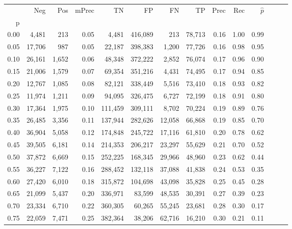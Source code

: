 \begin{tabular}{rrrrrrrrrrrrrr}
\toprule
{} &     Neg &    Pos & mPrec &       TN &       FP &      FN &      TP &  Prec &   Rec & $\hat{p}$ \\
p    &         &        &       &          &          &         &         &       &       &           \\
\midrule
0.00 &   4,481 &    213 &  0.05 &    4,481 &  416,089 &     213 &  78,713 &  0.16 &  1.00 &      0.99 \\
0.05 &  17,706 &    987 &  0.05 &   22,187 &  398,383 &   1,200 &  77,726 &  0.16 &  0.98 &      0.95 \\
0.10 &  26,161 &  1,652 &  0.06 &   48,348 &  372,222 &   2,852 &  76,074 &  0.17 &  0.96 &      0.90 \\
0.15 &  21,006 &  1,579 &  0.07 &   69,354 &  351,216 &   4,431 &  74,495 &  0.17 &  0.94 &      0.85 \\
0.20 &  12,767 &  1,085 &  0.08 &   82,121 &  338,449 &   5,516 &  73,410 &  0.18 &  0.93 &      0.82 \\
0.25 &  11,974 &  1,211 &  0.09 &   94,095 &  326,475 &   6,727 &  72,199 &  0.18 &  0.91 &      0.80 \\
0.30 &  17,364 &  1,975 &  0.10 &  111,459 &  309,111 &   8,702 &  70,224 &  0.19 &  0.89 &      0.76 \\
0.35 &  26,485 &  3,356 &  0.11 &  137,944 &  282,626 &  12,058 &  66,868 &  0.19 &  0.85 &      0.70 \\
0.40 &  36,904 &  5,058 &  0.12 &  174,848 &  245,722 &  17,116 &  61,810 &  0.20 &  0.78 &      0.62 \\
0.45 &  39,505 &  6,181 &  0.14 &  214,353 &  206,217 &  23,297 &  55,629 &  0.21 &  0.70 &      0.52 \\
0.50 &  37,872 &  6,669 &  0.15 &  252,225 &  168,345 &  29,966 &  48,960 &  0.23 &  0.62 &      0.44 \\
0.55 &  36,227 &  7,122 &  0.16 &  288,452 &  132,118 &  37,088 &  41,838 &  0.24 &  0.53 &      0.35 \\
0.60 &  27,420 &  6,010 &  0.18 &  315,872 &  104,698 &  43,098 &  35,828 &  0.25 &  0.45 &      0.28 \\
0.65 &  21,099 &  5,437 &  0.20 &  336,971 &   83,599 &  48,535 &  30,391 &  0.27 &  0.39 &      0.23 \\
0.70 &  23,334 &  6,710 &  0.22 &  360,305 &   60,265 &  55,245 &  23,681 &  0.28 &  0.30 &      0.17 \\
0.75 &  22,059 &  7,471 &  0.25 &  382,364 &   38,206 &  62,716 &  16,210 &  0.30 &  0.21 &      0.11 \\

\end{tabular}
